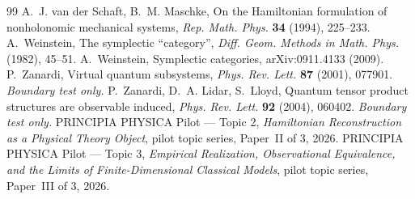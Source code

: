 \documentclass[12pt,a4paper]{article}
\theoremstyle{definition}
\theoremstyle{plain}
\theoremstyle{commentary}
\begin{document}
\begin{thebibliography}{99}
 A.~J. van der Schaft, B.~M. Maschke, On the Hamiltonian formulation of nonholonomic mechanical systems, \emph{Rep. Math. Phys.} \textbf{34} (1994), 225--233.
 A.~Weinstein, The symplectic ``category'', \emph{Diff. Geom. Methods in Math. Phys.} (1982), 45--51.
 A.~Weinstein, Symplectic categories, arXiv:0911.4133 (2009).
 P.~Zanardi, Virtual quantum subsystems, \emph{Phys. Rev. Lett.} \textbf{87} (2001), 077901. \emph{Boundary test only.}
 P.~Zanardi, D.~A. Lidar, S.~Lloyd, Quantum tensor product structures are observable induced, \emph{Phys. Rev. Lett.} \textbf{92} (2004), 060402. \emph{Boundary test only.}
 PRINCIPIA PHYSICA Pilot --- Topic 2, \emph{Hamiltonian Reconstruction as a Physical Theory Object}, pilot topic series, Paper~II of 3, 2026.
 PRINCIPIA PHYSICA Pilot --- Topic 3, \emph{Empirical Realization, Observational Equivalence, and the Limits of Finite-Dimensional Classical Models}, pilot topic series, Paper~III of 3, 2026.
\end{thebibliography}
\end{document}
